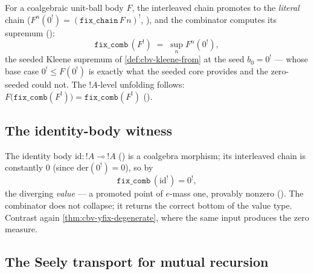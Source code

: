 \begin{theorem}%
\label{thm:cbv-fix-coalg}
\rocqok
{}\rocqok
{}
For a coalgebraic unit-ball body $F$, the interleaved chain promotes to
the \emph{literal} chain
($F^n(0^!) = (\mathtt{fix\_chain}\,F\,n)^!$,
), and the
combinator computes its supremum
():
\[
  \mathtt{fix\_comb}\,(F^!)
  \;=\;
  \sup_n F^n(0^!),
\]
the seeded Kleene supremum of \autoref{def:cbv-kleene-from} at the seed
$b_0 = 0^!$ --- whose base case $0^! \leq F(0^!)$ is exactly what the
seeded core provides and the zero-seeded
 could not. The
$\mathord{!}A$-level unfolding follows:
$F\bigl(\mathtt{fix\_comb}(F^!)\bigr) = \mathtt{fix\_comb}(F^!)$
().
\end{theorem}

\subsection{The identity-body witness}%
\label{ssec:cbv-fix-id}

\begin{lemma}\label{lem:cbv-fix-id}
\rocqok
{}\rocqok
{}\rocqok
{}
The identity body
$\mathrm{id} : \mathord{!}A \multimap \mathord{!}A$
() is a coalgebra
morphism; its interleaved chain is constantly $0$ (since
$\mathrm{der}(0^!) = 0$), so by
\[
  \mathtt{fix\_comb}\,(\mathrm{id}^!) = 0^{!},
\]
the diverging \emph{value} --- a promoted point of $e$-mass one,
provably nonzero
(). The
combinator does not collapse; it returns the correct bottom of the
value type. Contrast again \autoref{thm:cbv-yfix-degenerate}, where the
same input produces the zero measure.
\end{lemma}

\subsection{The Seely transport for mutual recursion}%
\label{ssec:cbv-fix-mr}

